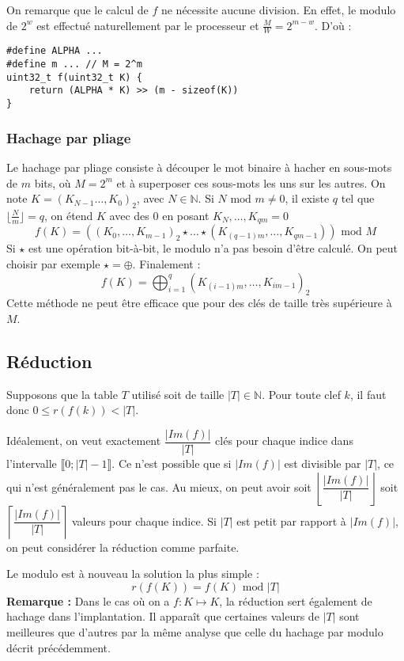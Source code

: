 \documentclass[../../../main.tex]{subfiles}
\begin{document}
On remarque que le calcul de $f$ ne nécessite aucune division. En effet, le modulo de $2^w$ est effectué naturellement par le processeur et $\frac{M}{W} = 2^{m-w}$. D'où :
\begin{verbatim}
#define ALPHA ...
#define m ... // M = 2^m
uint32_t f(uint32_t K) {
	return (ALPHA * K) >> (m - sizeof(K))
}
\end{verbatim}
\subsubsection{Hachage par pliage}
Le hachage par pliage consiste à découper le mot binaire à hacher en sous-mots de $m$ bits, où $M = 2^m$ et à superposer ces sous-mots les uns sur les autres. On note $K = (K_{N-1} \dots, K_0)_2$, avec $N\in\mathbb{N}$. Si $N\text{ mod }m \neq 0$, il existe $q$ tel que $\lfloor\frac{N}{m}\rfloor = q$, on étend $K$ avec des $0$ en posant $K_N, \dots, K_{qm} = 0$
$$f(K) = \left((K_0, \dots, K_{m-1})_2\star \dots \star (K_{(q-1)m}, \dots, K_{qm - 1})\right)\text{ mod }M$$
Si $\star$ est une opération bit-à-bit, le modulo n'a pas besoin d'être calculé. On peut choisir par exemple $\star = \oplus$. Finalement :
$$f(K) = \displaystyle\bigoplus_{i = 1}^{q}(K_{(i - 1)m}, \dots, K_{im - 1})_2$$
Cette méthode ne peut être efficace que pour des clés de taille très supérieure à $M$.
\subsection{Réduction}
Supposons que la table $T$ utilisé soit de taille $|T|\in\mathbb{N}$. Pour toute clef $k$, il faut donc $0\leq r(f(k)) < |T|$.

Idéalement, on veut exactement $\dfrac{|Im(f)|}{|T|}$ clés pour chaque indice dans l'intervalle $\llbracket 0; |T| - 1\rrbracket$. Ce n'est possible que si $|Im(f)|$ est divisible par $|T|$, ce qui n'est généralement pas le cas. Au mieux, on peut avoir soit $\left\lfloor \dfrac{|Im(f)|}{|T|}\right\rfloor$ soit $\left\lceil \dfrac{|Im(f)|}{|T|}\right\rceil$ valeurs pour chaque indice. Si $|T|$ est petit par rapport à $|Im(f)|$, on peut considérer la réduction comme parfaite.

Le modulo est à nouveau la solution la plus simple :
$$r(f(K)) = f(K)\text{ mod }|T|$$
\textbf{Remarque :} Dans le cas où on a $f : K\mapsto K$, la réduction sert également de hachage dans l'implantation. Il apparaît que certaines valeurs de $|T|$ sont meilleures que d'autres par la même analyse que celle du hachage par modulo décrit précédemment. %
\end{document}
